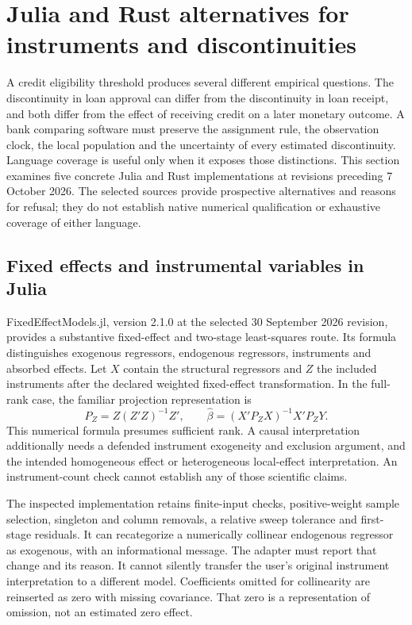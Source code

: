 \section{Julia and Rust alternatives for instruments and discontinuities}
\label{exec23:otheriv-scope}

A credit eligibility threshold produces several different empirical
questions. The discontinuity in loan approval can differ from the
discontinuity in loan receipt, and both differ from the effect of receiving
credit on a later monetary outcome. A bank comparing software must preserve
the assignment rule, the observation clock, the local population and the
uncertainty of every estimated discontinuity. Language coverage is useful
only when it exposes those distinctions. This section examines five concrete
Julia and Rust implementations at revisions preceding 7 October 2026. The
selected sources provide prospective alternatives and reasons for refusal;
they do not establish native numerical qualification or exhaustive coverage
of either language.
\citep{exec23_otheriv_source_0,exec23_otheriv_source_1,exec23_otheriv_source_2,exec23_otheriv_source_3,exec23_otheriv_source_4}

\subsection{Fixed effects and instrumental variables in Julia}
\label{exec23:otheriv-fe}
FixedEffectModels.jl, version 2.1.0 at the selected 30 September 2026
revision, provides a substantive fixed-effect and two-stage least-squares
route. Its formula distinguishes exogenous regressors, endogenous
regressors, instruments and absorbed effects. Let $X$ contain the structural
regressors and $Z$ the included instruments after the declared weighted
fixed-effect transformation. In the full-rank case, the familiar projection
representation is
\begin{equation}
 P_Z=Z(Z'Z)^{-1}Z',\qquad
 \widehat\beta=(X'P_ZX)^{-1}X'P_ZY.
 \label{exec23:otheriv-2sls}
\end{equation}
This numerical formula presumes sufficient rank. A causal interpretation
additionally needs a defended instrument exogeneity and exclusion argument,
and the intended homogeneous effect or heterogeneous local-effect
interpretation. An instrument-count check cannot establish any of those
scientific claims.
\citep{exec23_otheriv_source_0}

The inspected implementation retains finite-input checks, positive-weight
sample selection, singleton and column removals, a relative sweep tolerance
and first-stage residuals. It can recategorize a numerically collinear
endogenous regressor as exogenous, with an informational message. The
adapter must report that change and its reason. It cannot silently transfer
the user's original instrument interpretation to a different model.
Coefficients omitted for collinearity are reinserted as zero with missing
covariance. That zero is a representation of omission, not an estimated
zero effect. \citep{exec23_otheriv_source_0}

